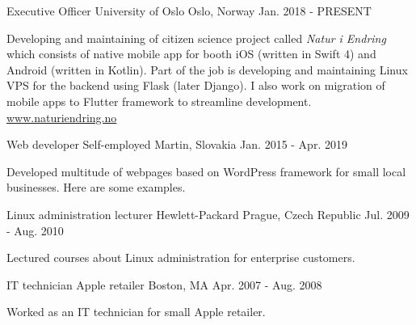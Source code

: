 
\begin{cventries}
  \cventry
    {Executive Officer} %
    {University of Oslo} %
    {Oslo, Norway} %
    {Jan. 2018 - PRESENT} %
    {
      \begin{cvitems} %
        \item {Developing and maintaining of citizen science project called \textit{Natur i Endring} which consists of native mobile app for booth iOS (written in Swift 4) and Android (written in Kotlin). Part of the job is developing and maintaining Linux VPS for the backend using Flask (later Django). I also work on migration of mobile apps to Flutter framework to streamline development. \underline{\href{https://naturiendring.no}{www.naturiendring.no}}}
      \end{cvitems}
    }
    
    \cventry
    {Web developer} %
    {Self-employed} %
    {Martin, Slovakia} %
    {Jan. 2015 - Apr. 2019} %
    {
      \begin{cvitems} %
        \item {Developed multitude of webpages based on WordPress framework for small local businesses. Here are some examples.}
      \end{cvitems}
    }

  \cventry
    {Linux administration lecturer} %
    {Hewlett-Packard} %
    {Prague, Czech Republic} %
    {Jul. 2009 - Aug. 2010} %
    {
      \begin{cvitems} %
        \item {Lectured courses about Linux administration for enterprise customers.}
      \end{cvitems}
    }

  \cventry
    {IT technician} %
    {Apple retailer} %
    {Boston, MA} %
    {Apr. 2007 - Aug. 2008} %
    {
      \begin{cvitems} %
        \item {Worked as an IT technician for small Apple retailer.}
      \end{cvitems}
    }

  
\end{cventries}
